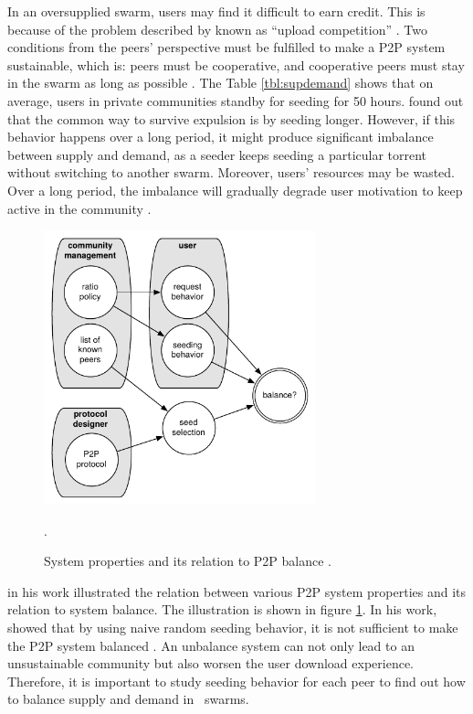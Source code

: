 In an oversupplied swarm, users may find it difficult to earn credit. This is because of the problem described by \citeauthor{2011:managesupplydemand:meulpolder} known as ``upload competition'' \cite{2011:managesupplydemand:meulpolder}. Two conditions from the peers' perspective must be fulfilled to make a P2P system sustainable, which is: peers must be cooperative, and cooperative peers must stay in the swarm as long as possible \cite{2011:managesupplydemand:meulpolder}. The Table \ref{tbl:supdemand} shows that on average, users in private communities standby for seeding for 50 hours. \citeauthor{2013:survivepriv:jia} found out that the common way to survive expulsion is by seeding longer. However, if this behavior happens over a long period, it might produce significant imbalance between supply and demand, as a seeder keeps seeding a particular torrent without switching to another swarm. Moreover, users' resources may be wasted. Over a long period, the imbalance will gradually degrade user motivation to keep active in the community \cite{2014:sustainabilitytorrent:chen}.

\begin{figure}[h]
	\centering
	\includegraphics[width=0.7\textwidth]{pics/p2psys_balance.pdf}
	\caption{System properties and its relation to P2P balance \cite{2011:managesupplydemand:meulpolder}.}.
	\label{fig:sysbalance}
\end{figure}

\citeauthor{2011:managesupplydemand:meulpolder} in his work illustrated the relation between various P2P system properties and its relation to system balance. The illustration is shown in figure \ref{fig:sysbalance}. In his work, \citeauthor{2011:managesupplydemand:meulpolder} showed that by using naive random seeding behavior, it is not sufficient to make the P2P system  balanced \cite{2011:managesupplydemand:meulpolder}. An unbalance system can not only lead to an unsustainable community but also worsen the user download experience. Therefore, it is important to study seeding behavior for each peer to find out how to balance supply and demand in \bt~swarms.

